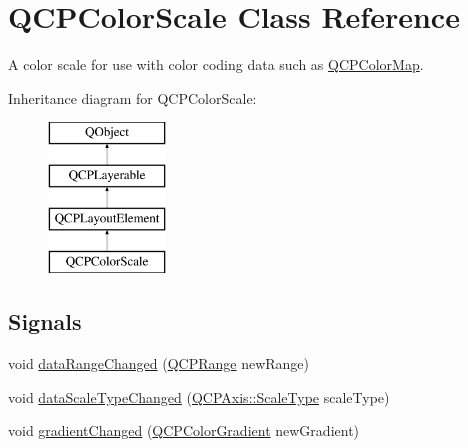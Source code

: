 \hypertarget{class_q_c_p_color_scale}{}\section{Q\+C\+P\+Color\+Scale Class Reference}
\label{class_q_c_p_color_scale}


A color scale for use with color coding data such as \hyperlink{class_q_c_p_color_map}{Q\+C\+P\+Color\+Map}.  


Inheritance diagram for Q\+C\+P\+Color\+Scale\+:\begin{figure}[H]
\begin{center}
\leavevmode
\includegraphics[height=4.000000cm]{class_q_c_p_color_scale}
\end{center}
\end{figure}
\subsection*{Signals}
\begin{DoxyCompactItemize}
\item 
void \hyperlink{class_q_c_p_color_scale_a293176da9447ec6819be1d901966a257}{data\+Range\+Changed} (\hyperlink{class_q_c_p_range}{Q\+C\+P\+Range} new\+Range)
\item 
void \hyperlink{class_q_c_p_color_scale_a61558b962f7791ff2f15a565dcf60181}{data\+Scale\+Type\+Changed} (\hyperlink{class_q_c_p_axis_a36d8e8658dbaa179bf2aeb973db2d6f0}{Q\+C\+P\+Axis\+::\+Scale\+Type} scale\+Type)
\item 
void \hyperlink{class_q_c_p_color_scale_a67a5eb06cf551d322885e8635a46378c}{gradient\+Changed} (\hyperlink{class_q_c_p_color_gradient}{Q\+C\+P\+Color\+Gradient} new\+Gradient)
\end{DoxyCompactItemize}
